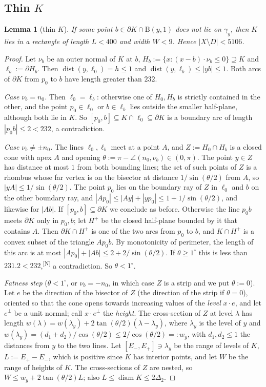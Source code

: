 \documentclass[11pt]{amsart}
\newtheorem{lemma}[theorem]{Lemma}
\theoremstyle{definition}
\theoremstyle{remark}
\newcommand{\Dt}{\Delta_2}
\newcommand{\dist}{\operatorname{dist}}
\newcommand{\Dd}{\mathrm{B}}      %
\newcommand{\chk}[1]{\textsuperscript{[#1]}}
\begin{document}
\subsection{Thin \texorpdfstring{$K$}{K}}
\begin{lemma}[thin $K$]\label{lem:thinK}
If some point $b\in\partial K\cap\Dd(y,1)$ does not lie on $\gamma_y$, then $K$ lies in a rectangle of length $L<400$ and width $W<9$. Hence $|X\setminus D|<5106$.
\end{lemma}
\begin{proof}
Let $\nu_b$ be an outer normal of $K$ at $b$, $H_b:=\{x:(x-b)\cdot\nu_b\le0\}\supseteq K$ and $\ell_b:=\partial H_b$. Then $\dist(y,\ell_0)=h\le1$ and $\dist(y,\ell_b)\le|yb|\le1$. Both arcs of $\partial K$ from $p_0$ to $b$ have length greater than $232$.

\emph{Case $\nu_b=n_0$.} Then $\ell_0=\ell_b$: otherwise one of $H_0,H_b$ is strictly contained in the other, and the point $p_0\in\ell_0$ or $b\in\ell_b$ lies outside the smaller half-plane, although both lie in $K$. So $[p_0,b]\subseteq K\cap\ell_0\subseteq\partial K$ is a boundary arc of length $|p_0b|\le2<232$, a contradiction.

\emph{Case $\nu_b\neq\pm n_0$.} The lines $\ell_0,\ell_b$ meet at a point $A$, and $Z:=H_0\cap H_b$ is a closed cone with apex $A$ and opening $\theta:=\pi-\angle(n_0,\nu_b)\in(0,\pi)$. The point $y\in Z$ has distance at most $1$ from both bounding lines; the set of such points of $Z$ is a rhombus whose far vertex is on the bisector at distance $1/\sin(\theta/2)$ from $A$, so $|yA|\le1/\sin(\theta/2)$. The point $p_0$ lies on the boundary ray of $Z$ in $\ell_0$ and $b$ on the other boundary ray, and $|Ap_0|\le|Ay|+|yp_0|\le1+1/\sin(\theta/2)$, and likewise for $|Ab|$. If $[p_0,b]\subseteq\partial K$ we conclude as before. Otherwise the line $p_0b$ meets $\partial K$ only in $p_0,b$; let $H^+$ be the closed half-plane bounded by it that contains $A$. Then $\partial K\cap H^+$ is one of the two arcs from $p_0$ to $b$, and $K\cap H^+$ is a convex subset of the triangle $Ap_0b$. By monotonicity of perimeter, the length of this arc is at most $|Ap_0|+|Ab|\le2+2/\sin(\theta/2)$. If $\theta\ge1^\circ$ this is less than $231.2<232$,\chk{N} a contradiction. So $\theta<1^\circ$.

\emph{Fatness step} ($\theta<1^\circ$, or $\nu_b=-n_0$, in which case $Z$ is a strip and we put $\theta:=0$). Let $e$ be the direction of the bisector of $Z$ (the direction of the strip if $\theta=0$), oriented so that the cone opens towards increasing values of the \emph{level} $x\cdot e$, and let $e^\perp$ be a unit normal; call $x\cdot e^\perp$ the \emph{height}. The cross-section of $Z$ at level $\lambda$ has length $w(\lambda)=w(\lambda_y)+2\tan(\theta/2)(\lambda-\lambda_y)$, where $\lambda_y$ is the level of $y$ and $w(\lambda_y)=(d_1+d_2)/\cos(\theta/2)\le2/\cos(\theta/2)=:w_y$, with $d_1,d_2\le1$ the distances from $y$ to the two lines. Let $[E_-,E_+]\ni\lambda_y$ be the range of levels of $K$, $L:=E_+-E_-$, which is positive since $K$ has interior points, and let $W$ be the range of heights of $K$. The cross-sections of $Z$ are nested, so $W\le w_y+2\tan(\theta/2)L$; also $L\le\operatorname{diam}K\le2\Dt$.


\end{proof}
\end{document}
